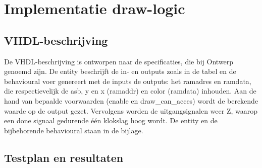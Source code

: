 \documentclass{scrreprt} %
\date{22 november 2013}
\begin{document}
\chapter{Implementatie draw-logic}

\section{VHDL-beschrijving}
De VHDL-beschrijving is ontworpen naar de specificaties, die bij Ontwerp genoemd zijn. De entity beschrijft de in- en outputs zoals in de tabel en de behavioural  voer genereert met de inputs de outputs: het ramadres en ramdata, die respectievelijk de asb, y en x (ramaddr) en color (ramdata) inhouden. Aan de hand van bepaalde voorwaarden (enable en draw_can_acces) wordt de berekende waarde op de output gezet. Vervolgens worden de uitgangsignalen weer Z, waarop een done signaal gedurende één klokslag hoog wordt. De entity en de bijbehorende behavioural staan in de bijlage. 

\section{Testplan en resultaten}
\end{document}
